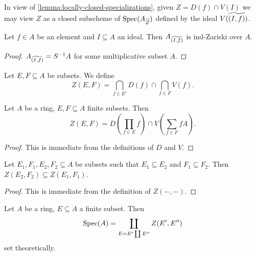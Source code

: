 In view of \ref{lemma:locally-closed-specializations}, given $Z = D(f) \cap V(I)$ we may
view $Z$ as a closed subscheme of $\mathrm{Spec}(A_{\widetilde{Z}})$ defined by the ideal
$V( \widetilde{(I, f)})$.

\begin{lemma}
    Let $f \in A$ be an element and $I \subseteq A$ an ideal. Then
    $A_{\widetilde{(I, f)}}$ is ind-Zariski over $A$.
    \label{lemma:tilde-locclosed-ind-zariski}
\end{lemma}

\begin{proof}
    $A_{\widetilde{(I, f)}} = S^{-1} A$ for some multiplicative subset $A$.
\end{proof}

\begin{definition}
    Let $E, F \subseteq A$ be subsets. We define
    \[
    Z(E, F) = \bigcap_{f \in E'} D(f) \cap \bigcap_{f \in F} V(f)
    .\]
    \label{def:subset-stratum}
\end{definition}

\begin{lemma}
    Let $A$ be a ring, $E, F \subseteq A$ finite subsets. Then
    \[
    Z(E, F) = D\left( \prod_{f \in E}  f \right) \cap V\left( \sum_{f \in F} fA \right)
    .\]
    \label{lemma:subset-stratum-equals-inter}
\end{lemma}

\begin{proof}
    This is immediate from the definitions of $D$ and $V$.
\end{proof}

\begin{lemma}
    Let $E_1, F_1, E_2, F_2 \subseteq A$ be subsets such that $E_1 \subseteq E_2$ and
    $F_1 \subseteq F_2$. Then $Z(E_2, F_2) \subseteq Z(E_1, F_1)$.
    \label{lemma:subset-stratum-mono}
\end{lemma}

\begin{proof}
    This is immediate from the definition of $Z(-, -)$.
\end{proof}

\begin{lemma}
    Let $A$ be a ring, $E \subseteq A$ a finite subset. Then
    \[
        \mathrm{Spec}(A) = \coprod_{E = E' \coprod E''} Z(E', E'')
    \] set theoretically.
    \label{lemma:subset-stratification}
\end{lemma}

